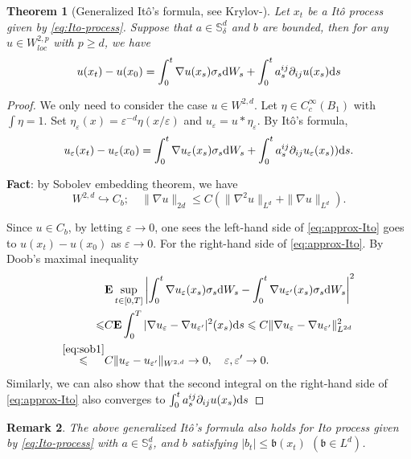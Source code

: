 \documentclass[twoside, 12pt]{book}
\numberwithin{equation}{chapter}
\newtheorem{theorem}{Theorem}[section]
\newtheorem{remark}[theorem]{Remark}
\def\mS{{\mathbb S}}
\def\bE{{\mathbf E}}
\def\l{\left}
\def\r{\right}
\def\geq{\geqslant}
\def\leq{\leqslant}
\def\p{\partial}
\def\d{\text{\rm{d}}}
\def\eps{\varepsilon}
\begin{document}
	\begin{theorem}[Generalized Itô's formula,  see Krylov-\cite{krylov1980controlled}]
		Let $x_t$ be a  It\^o process given by \eqref{eq:Ito-process}. Suppose that $a\in \mS^d_\delta$ and $b$ are bounded, then for any $u\in W^{2,p}_{loc}$ with $p\geq d$, we have 
		\begin{equation}
			u(x_t)-u(x_0)=\int_0^t \nabla u(x_s)\sigma_s \d W_s+ \int_0^t a_s^{ij} \p_{ij}u(x_s)\d s 
		\end{equation}
	\end{theorem}
	\begin{proof}
		We only need to consider the case $u\in W^{2,d}$. 
		Let $\eta\in C_c^\infty(B_1)$ with $\int\eta=1$. Set $\eta_\eps(x)=\eps^{-d} \eta(x/\eps)$ and $u_\eps=u*\eta_\eps$. By It\^o's formula, 
		\begin{equation}\label{eq:approx-Ito}
			u_\eps(x_t)-u_\eps(x_0)=\int_0^t \nabla u_\eps (x_s)\sigma_s \d W_s+ \int_0^t a_s^{ij} \p_{ij}u_\eps(x_s) ) \d s. 
		\end{equation}
		\begin{framed}
			{\bf Fact}: by Sobolev embedding theorem, we have  
			\begin{equation}\label{eq:sob1}
				W^{2,d}\hookrightarrow C_b; \quad \|\nabla u\|_{2d} \leq C (\|\nabla^2 u\|_{L^d} + \|\nabla u\|_{L^d}) . 
			\end{equation}
		\end{framed}
		Since $u\in C_b$, by letting $\eps\to0$, one sees the left-hand side of \eqref{eq:approx-Ito} goes to $u(x_t)-u(x_0)$ as $\eps\to0$. For the right-hand side of \eqref{eq:approx-Ito}. 
		By Doob's maximal inequality
		\[
		\begin{aligned}
			&\bE \sup_{t\in [0,T]} \l|\int_0^t \nabla u_\eps (x_s)\sigma_s \d W_s -\int_0^t \nabla u_{\eps'} (x_s)\sigma_s \d W_s\r|^2\\
			\leq & C \bE \int_0^T |\nabla u_\eps- \nabla u_{\eps'}|^2 (x_s) \d s \leq C \|\nabla u_\eps -\nabla u_{\eps'}\|^2_{L^{2d}}\\
			\overset{\eqref{eq:sob1}}{\leq} & C \|u_\eps - u_{\eps'}\|_{W^{2,d}} \to 0, \quad \eps,\eps'\to0. 
		\end{aligned}
		\]
		Similarly, we can also show that the second integral on the right-hand side of \eqref{eq:approx-Ito} also converges to $ \int_0^t a_s^{ij} \p_{ij}u(x_s)  \d s$
	\end{proof}

 \begin{remark}
     The above generalized It\^o's formula also holds for Ito process given by \eqref{eq:Ito-process} with $a\in \mS^d_\delta$, and $b$ satisfying $|b_t|\leq \mathfrak{b}(x_t)$ $(\mathfrak{b}\in L^d)$. 
 \end{remark}
  
\end{document}
